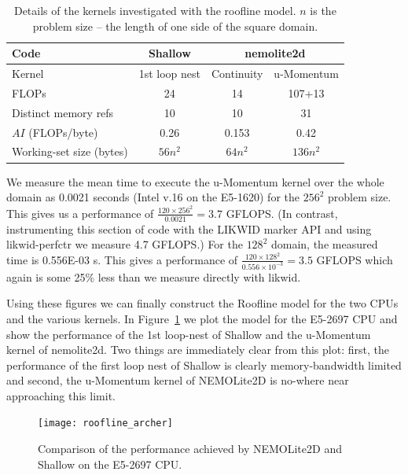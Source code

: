 \documentclass[12pt]{article}
\begin{document}
\begin{table}
\begin{tabular}{|l|c|c|c|}
\hline
Code                       & Shallow & \multicolumn{2}{c|}{nemolite2d} \\
\hline
Kernel                     & 1st loop nest & Continuity & u-Momentum \\
\hline                                
FLOPs                      & 24      &    14      &   107+13   \\
Distinct memory refs       & 10      &    10      &   31       \\
$AI$ (FLOPs/byte)          & 0.26    &  0.153     &   0.42     \\
Working-set size (bytes)   & $56n^2$ &  $64n^2$   &   $136n^2$ \\
\hline
\end{tabular}
\caption{Details of the kernels investigated with the roofline
  model. $n$ is the problem size -- the length of one side of the
  square domain.}
\label{TAB_kernel_details}
\end{table}

We measure the mean time to execute the u-Momentum kernel over the
whole domain as 0.0021 seconds (Intel v.16 on the E5-1620) for the
$256^2$ problem size. This gives us a performance of $\frac{120\times
  256^2}{0.0021} = 3.7$ GFLOPS. (In contrast, instrumenting this
section of code with the LIKWID marker API and using likwid-perfctr we
measure 4.7 GFLOPS.)  For the $128^2$ domain, the measured time is
0.556E-03 s. This gives a performance of $\frac{120\times
  128^2}{0.556\times10^{-3}} = 3.5$ GFLOPS which again is some 25\% less
than we measure directly with likwid.

Using these figures we can finally construct the Roofline model for
the two CPUs and the various kernels. In
Figure~\ref{FIG_roofline_archer} we plot the model for the E5-2697 CPU
and show the performance of the 1st loop-nest of Shallow and the
u-Momentum kernel of nemolite2d. Two things are immediately clear from
this plot: first, the performance of the first loop nest of Shallow is
clearly memory-bandwidth limited and second, the u-Momentum kernel of
NEMOLite2D is no-where near approaching this limit.

\begin{figure}
\centering
\texttt{[image: roofline\_archer]}
\caption{Comparison of the performance achieved by NEMOLite2D and
  Shallow on the E5-2697 CPU.}
\label{FIG_roofline_archer}
\end{figure}
\end{document}

